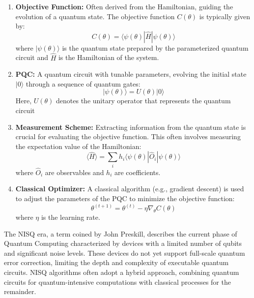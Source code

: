 \documentclass[12pt,a4paper]{report}
\begin{document}
\begin{enumerate}
  \item \textbf{Objective Function:} Often derived from the Hamiltonian, guiding the evolution of a quantum state. The objective function \(C(\theta)\) is typically given by:
        \begin{equation}
          C(\theta) = \langle \psi(\theta) | \hat{H} | \psi(\theta) \rangle
        \end{equation}
        where \(| \psi(\theta) \rangle\) is the quantum state prepared by the parameterized quantum circuit and \(\hat{H}\) is the Hamiltonian of the system.

  \item \textbf{PQC:} A quantum circuit with tunable parameters, evolving the initial state \(|0\rangle\) through a sequence of quantum gates:
        \begin{equation}
          | \psi(\theta) \rangle = U(\theta) | 0 \rangle
        \end{equation}
        Here, \(U(\theta)\) denotes the unitary operator that represents the quantum circuit

  \item \textbf{Measurement Scheme:} Extracting information from the quantum state is crucial for evaluating the objective function. This often involves measuring the expectation value of the Hamiltonian:
        \begin{equation}
          \langle \hat{H} \rangle = \sum_{i} h_i \langle \psi(\theta) | \hat{O}_i | \psi(\theta) \rangle
        \end{equation}
        where \(\hat{O}_i\) are observables and \(h_i\) are coefficients.

  \item \textbf{Classical Optimizer:} A classical algorithm (e.g., gradient descent) is used to adjust the parameters of the PQC to minimize the objective function:
        \begin{equation}
          \theta^{(t+1)} = \theta^{(t)} - \eta \nabla_\theta C(\theta)
        \end{equation}
        where \(\eta\) is the learning rate.
\end{enumerate}
The NISQ era, a term coined by John Preskill, describes the current phase of Quantum Computing characterized by devices with a limited number of qubits and significant noise levels. These devices do not yet support full-scale quantum error correction, limiting the depth and complexity of executable quantum circuits. NISQ algorithms often adopt a hybrid approach, combining quantum circuits for quantum-intensive computations with classical processes for the remainder.
\end{document}
